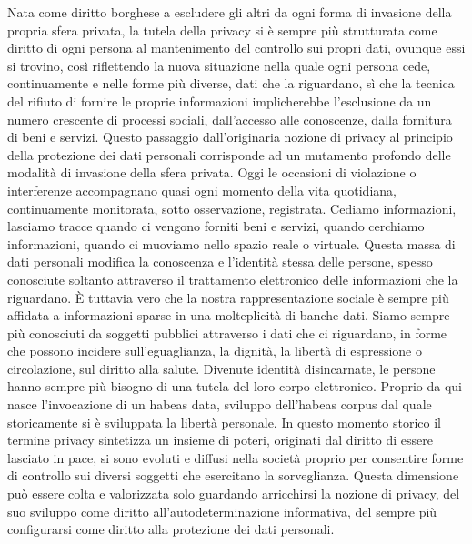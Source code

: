 Nata come diritto borghese a escludere gli altri da ogni forma di invasione della propria sfera privata, la tutela della privacy si è sempre più strutturata come diritto di ogni persona al mantenimento del controllo sui propri dati, ovunque  essi si trovino, così riflettendo la nuova situazione nella quale ogni persona cede, continuamente e nelle forme più diverse, dati che la riguardano, sì che la tecnica del rifiuto di fornire le proprie informazioni implicherebbe l’esclusione da un numero crescente di processi sociali, dall’accesso alle conoscenze, dalla fornitura di beni e servizi. 
Questo passaggio dall’originaria nozione di privacy al principio della protezione dei dati personali corrisponde ad un mutamento profondo delle modalità di invasione della sfera privata. Oggi le occasioni di violazione o interferenze accompagnano quasi ogni momento della vita quotidiana, continuamente monitorata, sotto osservazione, registrata. Cediamo informazioni, lasciamo tracce quando ci vengono forniti beni e servizi, quando cerchiamo informazioni, quando ci muoviamo nello spazio reale o virtuale.
Questa massa di dati personali modifica la conoscenza e l’identità stessa delle persone, spesso conosciute soltanto attraverso il trattamento elettronico delle informazioni che la riguardano. È tuttavia vero che la nostra rappresentazione sociale è sempre più affidata a informazioni sparse in una molteplicità di banche dati. Siamo sempre più conosciuti da soggetti pubblici attraverso i dati che ci riguardano, in forme che possono incidere sull’eguaglianza, la dignità, la libertà di espressione o circolazione, sul diritto alla salute. Divenute identità disincarnate, le persone hanno sempre più bisogno di una tutela del loro corpo elettronico. Proprio da qui nasce l’invocazione di un habeas data, sviluppo dell’habeas corpus dal quale storicamente si è sviluppata la libertà personale. 
In questo momento storico il termine privacy sintetizza un insieme di poteri, originati dal diritto di essere lasciato in pace, si sono evoluti e diffusi nella società proprio per consentire forme di controllo sui diversi soggetti che esercitano la sorveglianza. Questa dimensione può essere colta e valorizzata solo guardando arricchirsi la nozione di privacy, del suo sviluppo come diritto all’autodeterminazione informativa, del sempre più configurarsi come diritto alla protezione dei dati personali.




